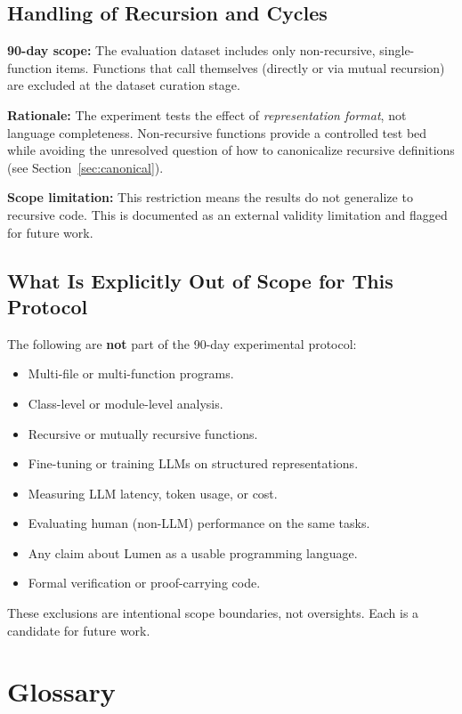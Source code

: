 \documentclass[11pt]{article}
\begin{document}
\subsection{Handling of Recursion and Cycles}

\textbf{90-day scope:}  The evaluation dataset includes only
non-recursive, single-function items.  Functions that call themselves
(directly or via mutual recursion) are excluded at the dataset curation
stage.

\textbf{Rationale:}  The experiment tests the effect of
\emph{representation format}, not language completeness.
Non-recursive functions provide a controlled test bed while avoiding
the unresolved question of how to canonicalize recursive definitions
(see Section~\ref{sec:canonical}).

\textbf{Scope limitation:}  This restriction means the results do not
generalize to recursive code.  This is documented as an external
validity limitation and flagged for future work.


\subsection{What Is Explicitly Out of Scope for This Protocol}

The following are \textbf{not} part of the 90-day experimental
protocol:

\begin{itemize}[nosep]
  \item Multi-file or multi-function programs.
  \item Class-level or module-level analysis.
  \item Recursive or mutually recursive functions.
  \item Fine-tuning or training LLMs on structured representations.
  \item Measuring LLM latency, token usage, or cost.
  \item Evaluating human (non-LLM) performance on the same tasks.
  \item Any claim about Lumen as a usable programming language.
  \item Formal verification or proof-carrying code.
\end{itemize}

These exclusions are intentional scope boundaries, not oversights.
Each is a candidate for future work.


\section*{Glossary}
\label{sec:glossary}
\end{document}

